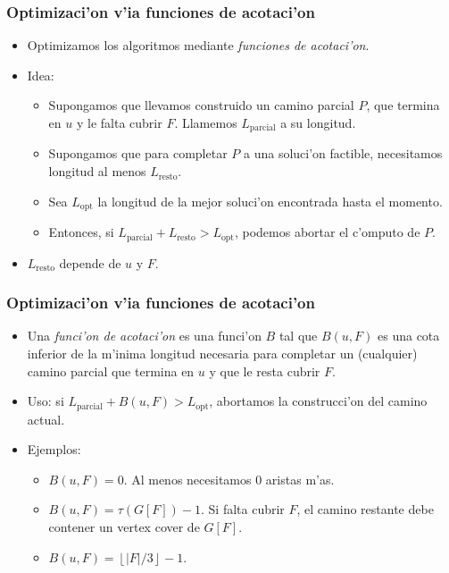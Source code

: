 \documentclass{beamer}
\begin{document}
\begin{frame}
\frametitle{Optimizaci'on v'ia funciones de acotaci'on}

\pause

\begin{itemize}
	\item Optimizamos los algoritmos mediante \textit{funciones de acotaci'on}.
	\pause
	\item Idea:
	\begin{itemize}
		\item Supongamos que llevamos construido un camino parcial $P$, que termina en $u$ y le falta cubrir $F$. Llamemos $L_{\text{parcial}}$ a su longitud.
		\pause
		\item Supongamos que para completar $P$ a una soluci'on factible, necesitamos longitud al menos $L_{\text{resto}}$.
		\pause
		\item Sea $L_{\text{opt}}$ la longitud de la mejor soluci'on encontrada hasta el momento.
		\pause
		\item Entonces, si $L_{\text{parcial}} + L_{\text{resto}} > L_{\text{opt}}$, podemos abortar el c'omputo de $P$.
		\pause
	\end{itemize}
	\pause	
	\item $L_{\text{resto}}$ depende de $u$ y $F$. 
\end{itemize}

\end{frame}

\begin{frame}
\frametitle{Optimizaci'on v'ia funciones de acotaci'on}

\begin{itemize}
\item Una \textit{funci'on de acotaci'on} es una funci'on $B$ tal que $B(u, F)$  es una cota inferior de la m'inima longitud necesaria para completar un (cualquier) camino parcial que termina en $u$ y que le resta cubrir $F$.

\pause

\item Uso: si $L_{\text{parcial}} + B(u, F) > L_{\text{opt}}$, abortamos la construcci'on del camino actual.

\pause

\item Ejemplos:
\pause
\begin{itemize}
	\item $B(u, F) = 0$. Al menos necesitamos 0 aristas m'as.
	\pause
	\item $B(u, F) = \tau(G[F]) - 1$. Si falta cubrir $F$, el camino restante debe contener un vertex cover de $G[F]$.
	\pause
	\item $B(u, F) = \left\lfloor |F| / 3 \right\rfloor - 1$.
\end{itemize}
\end{itemize}
 
\end{frame}
\end{document}
